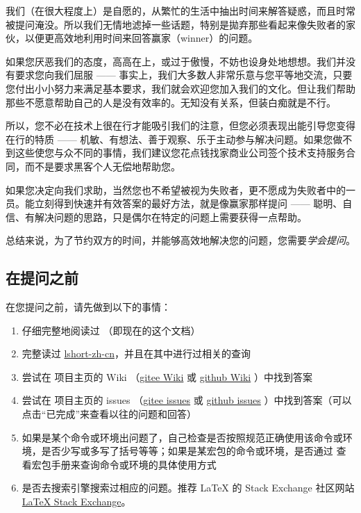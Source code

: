 我们（在很大程度上）是自愿的，从繁忙的生活中抽出时间来解答疑惑，而且时常被提问淹没。所以我们无情地滤掉一些话题，特别是拋弃那些看起来像失败者的家伙，以便更高效地利用时间来回答赢家（winner）的问题。

如果您厌恶我们的态度，高高在上，或过于傲慢，不妨也设身处地想想。我们并没有要求您向我们屈服 —— 事实上，我们大多数人非常乐意与您平等地交流，只要您付出小小努力来满足基本要求，我们就会欢迎您加入我们的文化。但让我们帮助那些不愿意帮助自己的人是没有效率的。无知没有关系，但装白痴就是不行。

所以，您不必在技术上很在行才能吸引我们的注意，但您必须表现出能引导您变得在行的特质 —— 机敏、有想法、善于观察、乐于主动参与解决问题。如果您做不到这些使您与众不同的事情，我们建议您花点钱找家商业公司签个技术支持服务合同，而不是要求黑客个人无偿地帮助您。

如果您决定向我们求助，当然您也不希望被视为失败者，更不愿成为失败者中的一员。能立刻得到快速并有效答案的最好方法，就是像赢家那样提问 —— 聪明、自信、有解决问题的思路，只是偶尔在特定的问题上需要获得一点帮助。

总结来说，为了节约双方的时间，并能够高效地解决您的问题，您需要\emph{学会提问}。


\subsection{在提问之前}

在您提问之前，请先做到以下的事情：
\begin{enumerate}
  \item 仔细完整地阅读过  （即现在的这个文档）
  \item 完整读过 \href{https://ctan.math.illinois.edu/info/lshort/chinese/lshort-zh-cn.pdf}{lshort-zh-cn}，并且在其中进行过相关的查询
  \item 尝试在  项目主页的 Wiki （\href{https://gitee.com/xkwxdyy/exam-zh/wikis/Home}{gitee Wiki} 或 \href{https://github.com/xkwxdyy/exam-zh/wikis/Home}{github Wiki} ）中找到答案
  \item 尝试在  项目主页的 issues （\href{https://gitee.com/xkwxdyy/exam-zh/issues}{gitee issues} 或 \href{https://github.com/xkwxdyy/exam-zh/issues}{github issues} ）中找到答案（可以点击“已完成”来查看以往的问题和回答）
  \item 如果是某个命令或环境出问题了，自己检查是否按照规范正确使用该命令或环境，是否少写或多写了括号等等；如果是某宏包的命令或环境，是否通过   查看宏包手册来查询命令或环境的具体使用方式
  \item 是否去搜索引擎搜索过相应的问题。推荐 \LaTeX{} 的 Stack Exchange 社区网站 \href{https://tex.stackexchange.com/}{LaTeX Stack Exchange}。
\end{enumerate}


